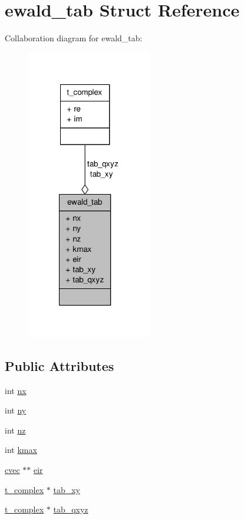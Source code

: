 \hypertarget{structewald__tab}{\section{ewald\-\_\-tab \-Struct \-Reference}
\label{structewald__tab}
}


\-Collaboration diagram for ewald\-\_\-tab\-:
\nopagebreak
\begin{figure}[H]
\begin{center}
\leavevmode
\includegraphics[width=155pt]{structewald__tab__coll__graph}
\end{center}
\end{figure}
\subsection*{\-Public \-Attributes}
\begin{DoxyCompactItemize}
\item 
int \hyperlink{structewald__tab_add3c79cda0e8f8d797541cd0d8c63590}{nx}
\item 
int \hyperlink{structewald__tab_a863851f7e8c22d7639d853a8224c3193}{ny}
\item 
int \hyperlink{structewald__tab_adbd9ada957d5e103fb5025ce50eab1eb}{nz}
\item 
int \hyperlink{structewald__tab_abe4ea2cc543abf8727ae22511281e8f7}{kmax}
\item 
\hyperlink{share_2template_2gromacs_2gmxcomplex_8h_abe37b03d366b92f1ce46e4401070bcfd}{cvec} $\ast$$\ast$ \hyperlink{structewald__tab_a70d0db67a818ff937d6fd2d0b3a90852}{eir}
\item 
\hyperlink{structt__complex}{t\-\_\-complex} $\ast$ \hyperlink{structewald__tab_a89dbf2666a697443ed66a92aecf59671}{tab\-\_\-xy}
\item 
\hyperlink{structt__complex}{t\-\_\-complex} $\ast$ \hyperlink{structewald__tab_abd819f9fd566c9352a07448ead17155d}{tab\-\_\-qxyz}
\end{DoxyCompactItemize}


